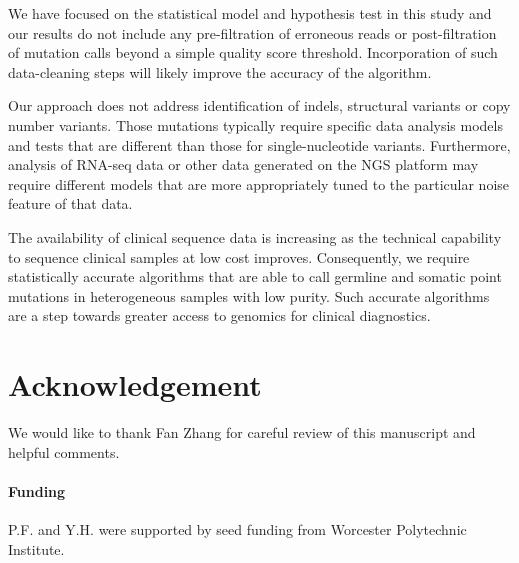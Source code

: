 \documentclass{bioinfo}
\begin{document}
We have focused on the statistical model and hypothesis test in this study and our results do not include any pre-filtration of erroneous reads or post-filtration of mutation calls beyond a simple quality score threshold. Incorporation of such data-cleaning steps will likely improve the accuracy of the algorithm.

Our approach does not address identification of indels, structural variants or copy number variants. Those mutations typically require specific data analysis models and tests that are different than those for single-nucleotide variants. Furthermore, analysis of RNA-seq data or other data generated on the NGS platform may require different models that are more appropriately tuned to the particular noise feature of that data.

The availability of clinical sequence data is increasing as the technical capability to sequence clinical samples at low cost improves. Consequently, we require statistically accurate algorithms that are able to call germline and somatic point mutations in heterogeneous samples with low purity. Such accurate algorithms are a step towards greater access to genomics for clinical diagnostics.

\section*{Acknowledgement}
We would like to thank Fan Zhang for careful review of this manuscript and helpful comments.

\paragraph{Funding\textcolon}  P.F. and Y.H. were supported by seed funding from Worcester Polytechnic Institute.



\end{document}
